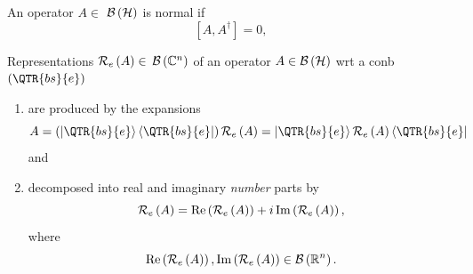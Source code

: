 \begin{definition}
An operator $A\in $ ${\cal B}\left( {\cal H}\right) $ is normal if 
\begin{equation}
\left[ A,A^{\dagger }\right] =0,
\end{equation}
\end{definition}

\begin{remark}
Representations ${\cal R}_{e}\left( A\right) \in $ ${\cal B}\left( {\Bbb C}%
^{n}\right) $ of an operator $A\in {\cal B}\left( {\cal H}\right) $ wrt a
conb $\left( \QTR{bs}{e}\right) $

\begin{enumerate}
\item are produced by the expansions%
\begin{equation}
A=\left( \left\vert \QTR{bs}{e}\right\rangle \left\langle \QTR{bs}{e}%
\right\vert \right) {\cal R}_{e}\left( A\right) =\left\vert \QTR{bs}{e}%
\right\rangle {\cal R}_{e}\left( A\right) \left\langle \QTR{bs}{e}\right\vert
\end{equation}%
and

\item decomposed into real and imaginary {\em number} parts by 
\begin{equation}
{\cal R}_{e}\left( A\right) =%
\mathop{\rm Re}%
\left( {\cal R}_{e}\left( A\right) \right) +i%
\mathop{\rm Im}%
\left( {\cal R}_{e}\left( A\right) \right) ,
\end{equation}%
where 
\begin{equation}
\mathop{\rm Re}%
\left( {\cal R}_{e}\left( A\right) \right) ,%
\mathop{\rm Im}%
\left( {\cal R}_{e}\left( A\right) \right) \in {\cal B}\left( {\Bbb R}%
^{n}\right) .
\end{equation}


\end{enumerate}
\end{remark}
